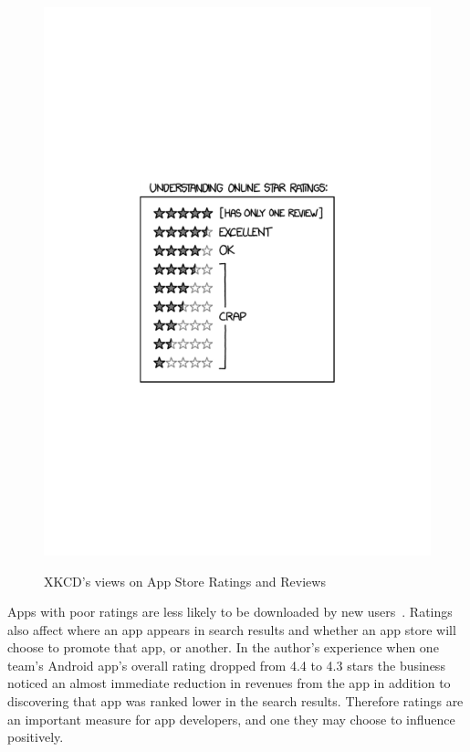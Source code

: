 \begin{figure}
\begin{minipage}{.5\textwidth}
  \includegraphics[width=\linewidth]{images/xkcd/star_ratings.pdf}
  \label{fig:xkcd-star-ratings}
\end{minipage}
    \caption{XKCD's views on App Store Ratings and Reviews}
    \label{fig:xkcd-app-store-ratings}
\end{figure}


Apps with poor ratings are less likely to be downloaded by new users~. Ratings also affect where an app appears in search results and whether an app store will choose to promote that app, or another. In the author's experience when one team's Android app's overall rating dropped from 4.4 to 4.3 stars the business noticed an almost immediate reduction in revenues from the app in addition to discovering that app was ranked lower in the search results. Therefore ratings are an important measure for app developers, and one they may choose to influence positively. 

